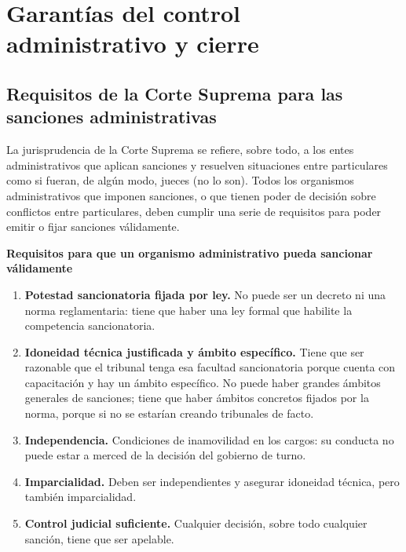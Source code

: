 \documentclass[12pt,oneside]{book}
\begin{document}
\chapter[Garantías del control administrativo]{Garantías del control administrativo y cierre}

\section{Requisitos de la Corte Suprema para las sanciones administrativas}

La jurisprudencia de la Corte Suprema se refiere, sobre todo, a los entes administrativos que aplican sanciones y resuelven situaciones entre particulares como si fueran, de algún modo, jueces (no lo son). Todos los organismos administrativos que imponen sanciones, o que tienen poder de decisión sobre conflictos entre particulares, deben cumplir una serie de requisitos para poder emitir o fijar sanciones válidamente.

\begin{important}
\textbf{Requisitos para que un organismo administrativo pueda sancionar válidamente}
\begin{enumerate}
    \item \textbf{Potestad sancionatoria fijada por ley.} No puede ser un decreto ni una norma reglamentaria: tiene que haber una ley formal que habilite la competencia sancionatoria.
    \item \textbf{Idoneidad técnica justificada y ámbito específico.} Tiene que ser razonable que el tribunal tenga esa facultad sancionatoria porque cuenta con capacitación y hay un ámbito específico. No puede haber grandes ámbitos generales de sanciones; tiene que haber ámbitos concretos fijados por la norma, porque si no se estarían creando tribunales de facto.
    \item \textbf{Independencia.} Condiciones de inamovilidad en los cargos: su conducta no puede estar a merced de la decisión del gobierno de turno.
    \item \textbf{Imparcialidad.} Deben ser independientes y asegurar idoneidad técnica, pero también imparcialidad.
    \item \textbf{Control judicial suficiente.} Cualquier decisión, sobre todo cualquier sanción, tiene que ser apelable.
\end{enumerate}
\end{important}
\end{document}
